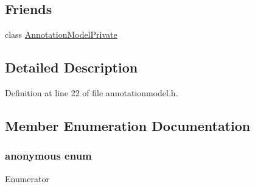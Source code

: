 \subsection*{Friends}
\begin{DoxyCompactItemize}
\item 
class \hyperlink{classAnnotationModel_adf657526a839f970d4c676cfc4853964}{Annotation\+Model\+Private}
\end{DoxyCompactItemize}


\subsection{Detailed Description}


Definition at line 22 of file annotationmodel.\+h.



\subsection{Member Enumeration Documentation}
\hypertarget{classAnnotationModel_aa517b64760be429123ee732470e08169}{\subsubsection[{anonymous enum}]{\setlength{\rightskip}{0pt plus 5cm}anonymous enum}}\label{classAnnotationModel_aa517b64760be429123ee732470e08169}
\begin{Desc}
\item[Enumerator]\par
\begin{description}
\item[{\em 
\hypertarget{classAnnotationModel_aa517b64760be429123ee732470e08169ab4fc887a927920384c188f096592e49b}{Author\+Role}\label{classAnnotationModel_aa517b64760be429123ee732470e08169ab4fc887a927920384c188f096592e49b}
}]\item[{\em 
\hypertarget{classAnnotationModel_aa517b64760be429123ee732470e08169a36e01de5a0952a700d4f7cd17491aa57}{Page\+Role}\label{classAnnotationModel_aa517b64760be429123ee732470e08169a36e01de5a0952a700d4f7cd17491aa57}
}]\end{description}
\end{Desc}


